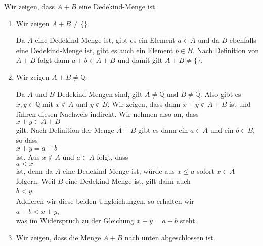 \solution
Wir zeigen, dass $A + B$ eine Dedekind-Menge ist.
\begin{enumerate}
\item Wir zeigen $A + B \not= \{\}$.

      Da $A$ eine Dedekind-Menge ist, gibt es ein Element $a \in A$ und da $B$ ebenfalls eine
      Dedekind-Menge ist, gibt es auch ein Element $b \in B$.  Nach Definition von $A + B$ folgt dann
      $a + b \in A + B$ und damit gilt $A + B \not= \{\}$.

\item Wir zeigen $A + B \not= \mathbb{Q}$.

      Da $A$ und $B$ Dedekind-Mengen sind, gilt $A \not= \mathbb{Q}$ und $B \not= \mathbb{Q}$.  Also gibt es 
      $x,y \in \mathbb{Q}$ mit $x \not\in A$ und $y \not\in B$.  Wir zeigen, dass dann  $x + y \not\in A + B$
      ist und führen diesen Nachweis indirekt.  Wir nehmen also an, dass
      \\[0.2cm]
      \hspace*{1.3cm}
      $x + y \in A + B$
      \\[0.2cm]
      gilt.  Nach Definition der Menge $A + B$ gibt es dann ein $a \in A$ und ein $b \in B$, so dass
      \\[0.2cm]
      \hspace*{1.3cm}
      $x + y = a + b$
      \\[0.2cm]
      ist.  Aus $x \not\in A$ und $a \in A$ folgt, dass 
      \\[0.2cm]
      \hspace*{1.3cm}
      $a < x$ 
      \\[0.2cm]
      ist, denn da $A$ eine Dedekind-Menge ist, würde aus $x \leq a$ sofort $x \in A$ folgern.  Weil $B$ eine
      Dedekind-Menge ist, gilt dann auch
      \\[0.2cm]
      \hspace*{1.3cm}
      $b < y$.
      \\[0.2cm]
      Addieren wir diese beiden Ungleichungen, so erhalten wir
      \\[0.2cm]
      \hspace*{1.3cm}
      $a + b < x + y$,
      \\[0.2cm]
      was im Widerspruch zu der Gleichung $x + y = a + b$ steht.
\item Wir zeigen, dass die Menge $A + B$ nach unten abgeschlossen ist.


\end{enumerate}
